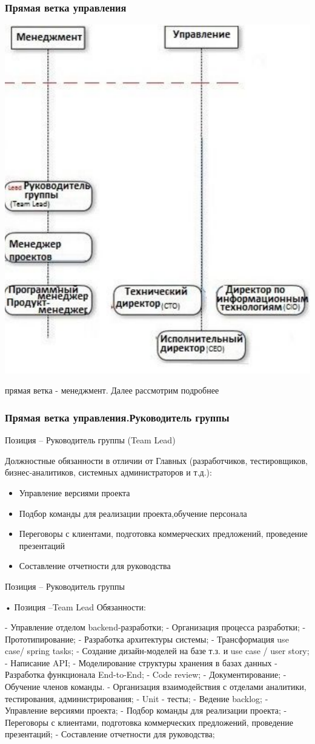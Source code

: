 \documentclass{../industrial-development}
\begin{document}
\begin{frame} \frametitle{Прямая ветка управления}
  \centerline{\includegraphics[width=0.63\linewidth]{11-IT-specialist's-way/sch22a.pdf}}
\end{frame}
 прямая ветка  -  менеджмент. Далее рассмотрим подробнее



\begin{frame} \frametitle{Прямая ветка управления.Руководитель группы}
 \begin{block}{}
  \alert{Позиция – Руководитель группы (Team Lead)}

Должностные обязанности в отличии от Главных (разработчиков, тестировщиков, бизнес-аналитиков, системных администраторов и т.д.): 
  \end{block}
  \begin{itemize}
  \item Управление версиями проекта
  \item Подбор команды для реализации проекта,обучение персонала
 \item  Переговоры с клиентами, подготовка коммерческих предложений, проведение презентаций
  \item Составление отчетности для руководства
  \end{itemize}
\end{frame}

\lecturenotes
Позиция – Руководитель группы

•	Позиция –Team Lead
Обязанности:

- Управление отделом backend-разработки;
- Организация процесса разработки;
- Прототипирование;
- Разработка архитектуры системы;
- Трансформация use case/ spring tasks;
- Создание дизайн-моделей на базе т.з. и use case / user story;
- Написание API;
- Моделирование структуры хранения в базах данных
- Разработка функционала End-to-End;
- Code review;
- Документирование;
- Обучение членов команды.
- Организация взаимодействия с отделами аналитики, тестирования, администрирования;
- Unit - тесты;
- Ведение backlog;
- Управление версиями проекта;
- Подбор команды для реализации проекта;
- Переговоры с клиентами, подготовка коммерческих предложений, проведение презентаций;
- Составление отчетности для руководства;
\end{document}
